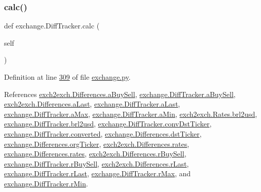 \subsubsection{\texorpdfstring{calc()}{calc()}}
{\footnotesize\ttfamily def exchange.\+Diff\+Tracker.\+calc (\begin{DoxyParamCaption}\item[{}]{self }\end{DoxyParamCaption})}



Definition at line \hyperlink{exchange_8py_source_l00309}{309} of file \hyperlink{exchange_8py_source}{exchange.\+py}.



References \hyperlink{exch2exch_8py_source_l00121}{exch2exch.\+Differences.\+a\+Buy\+Sell}, \hyperlink{exchange_8py_source_l00301}{exchange.\+Diff\+Tracker.\+a\+Buy\+Sell}, \hyperlink{exch2exch_8py_source_l00124}{exch2exch.\+Differences.\+a\+Last}, \hyperlink{exchange_8py_source_l00304}{exchange.\+Diff\+Tracker.\+a\+Last}, \hyperlink{exchange_8py_source_l00295}{exchange.\+Diff\+Tracker.\+a\+Max}, \hyperlink{exchange_8py_source_l00296}{exchange.\+Diff\+Tracker.\+a\+Min}, \hyperlink{exch2exch_8py_source_l00030}{exch2exch.\+Rates.\+brl2usd}, \hyperlink{exchange_8py_source_l00292}{exchange.\+Diff\+Tracker.\+brl2usd}, \hyperlink{exchange_8py_source_l00293}{exchange.\+Diff\+Tracker.\+conv\+Dst\+Ticker}, \hyperlink{exchange_8py_source_l00291}{exchange.\+Diff\+Tracker.\+converted}, \hyperlink{exchange_8py_source_l00265}{exchange.\+Differences.\+dst\+Ticker}, \hyperlink{exchange_8py_source_l00266}{exchange.\+Differences.\+org\+Ticker}, \hyperlink{exch2exch_8py_source_l00107}{exch2exch.\+Differences.\+rates}, \hyperlink{exchange_8py_source_l00264}{exchange.\+Differences.\+rates}, \hyperlink{exch2exch_8py_source_l00122}{exch2exch.\+Differences.\+r\+Buy\+Sell}, \hyperlink{exchange_8py_source_l00302}{exchange.\+Diff\+Tracker.\+r\+Buy\+Sell}, \hyperlink{exch2exch_8py_source_l00125}{exch2exch.\+Differences.\+r\+Last}, \hyperlink{exchange_8py_source_l00305}{exchange.\+Diff\+Tracker.\+r\+Last}, \hyperlink{exchange_8py_source_l00299}{exchange.\+Diff\+Tracker.\+r\+Max}, and \hyperlink{exchange_8py_source_l00298}{exchange.\+Diff\+Tracker.\+r\+Min}.


